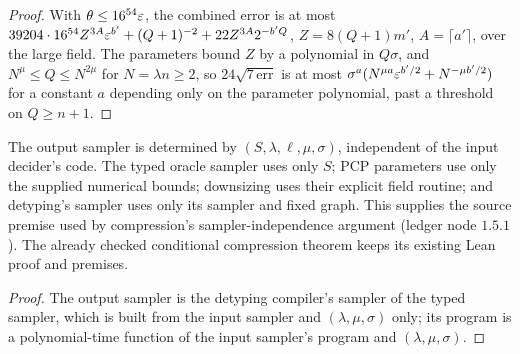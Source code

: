\begin{proof}
\leanok
With $\theta\leq 16^{54}\varepsilon$, the combined error is at most
$39204\cdot16^{54}Z^{3A}\varepsilon^{b'}+(Q+1)^{-2}+22Z^{3A}2^{-b'Q}$, $Z=8(Q+1)m'$, $A=\lceil
a'\rceil$, over the large field. The parameters bound $Z$ by a polynomial in $Q\sigma$, and
$N^\mu\leq Q\leq N^{2\mu}$ for $N=\lambda n\geq2$, so $24\sqrt{7\,\mathrm{err}}$ is at most
$\sigma^a(N^{\mu a}\varepsilon^{b'/2}+N^{-\mu b'/2})$ for a constant $a$ depending only on the
parameter polynomial, past a threshold on $Q\geq n+1$.
\end{proof}

\begin{lemma}
\label{lem:ar-sampler-independence}
\leanok
The output sampler is determined by $(S,\lambda,\ell,\mu,\sigma)$, independent
of the input decider's code. The typed oracle sampler uses only $S$; PCP
parameters use only the supplied numerical bounds; downsizing uses their
explicit field routine; and detyping's sampler uses only its sampler and
fixed graph. This supplies the source premise used by compression's
sampler-independence argument (ledger node $1.5.1$). The already checked
conditional compression theorem keeps its existing Lean proof and premises.
\end{lemma}

\begin{proof}
\leanok
The output sampler is the detyping compiler's sampler of the typed sampler, which is built from
the input sampler and $(\lambda,\mu,\sigma)$ only; its program is a polynomial-time function of
the input sampler's program and $(\lambda,\mu,\sigma)$.
\end{proof}

